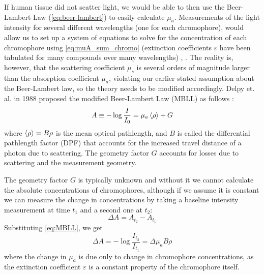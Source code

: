 If human tissue did not scatter light, we would be able to then use the Beer-Lambert Law (\autoref{eq:beer-lambert}) to easily calculate $\mu_a$. Measurements of the light intensity for several different wavelengths (one for each chromophore), would allow us to set up a system of equations to solve for the concentration of each chromophore using \autoref{eq:muA_sum_chromo} (extinction coefficients $\varepsilon$ have been tabulated for many compounds over many wavelengths) \cite[ch. 2]{Madsen2013}, \cite[ch. 5]{Handbook}. The reality is, however, that the scattering coefficient $\mu_s$ is several orders of magnitude larger than the absorption coefficient $\mu_a$, violating our earlier stated assumption about the Beer-Lambert law, so the theory needs to be modified accordingly. Delpy et. al. in 1988 proposed the modified Beer-Lambert Law (MBLL) as follows \cite{Delpy1988}:
\begin{equation} \label{eq:MBLL}
A \equiv -\log\frac{I}{I_0} = \mu_a\expval{\rho} + G
\end{equation}
where $\expval{\rho} = B\rho$ is the mean optical pathlength, and $B$ is called the differential pathlength factor (DPF) that accounts for the increased travel distance of a photon due to scattering. The geometry factor $G$ accounts for losses due to scattering and the measurement geometry. 

The geometry factor $G$ is typically unknown and without it we cannot calculate the absolute concentrations of chromophores, although if we assume it is constant we can measure the change in concentrations by taking a baseline intensity measurement at time $t_1$ and a second one at $t_2$:
\begin{equation}
\Delta A = A_{t_2}-A_{t_1}
\end{equation}
Substituting \autoref{eq:MBLL}, we get
\begin{equation}
\Delta A = -\log\frac{I_{t_2}}{I_{t_1}} = \Delta\mu_aB\rho
\end{equation}
where the change in $\mu_a$ is due only to change in chromophore concentrations, as the extinction coefficient $\varepsilon$ is a constant property of the chromophore itself.

